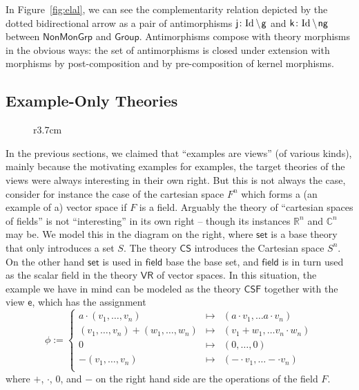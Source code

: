 \documentclass[11pt]{bluenote}
\def\setdiff#1#2{#1\kern.2em\backslash\kern.1em #2}
\def\cn#1{\mathsf{#1}}
\def\id{\text{Id}}
\begin{document}
In Figure~\ref{fig:elal}, we can see the complementarity relation depicted by the dotted
bidirectional arrow as a pair of antimorphisms $\cn{j}\colon\setdiff\id{\cn{g}}$ and
$\cn{k}\colon\setdiff\id{\cn{ng}}$ between $\cn{NonMonGrp}$ and $\cn{Group}$. Antimorphisms
compose with theory morphisms in the obvious ways: the set of antimorphisms is closed
under extension with morphisms by post-composition and by pre-composition of kernel
morphisms.

\subsection{Example-Only Theories}
\begin{wrapfigure}r{3.7cm}\vspace*{-1em}
  \vspace*{-1em}
\end{wrapfigure}
In the previous sections, we claimed that ``examples are views'' (of various kinds),
mainly because the motivating examples for examples, the target theories of the views were
always interesting in their own right. But this is not always the case, consider for
instance the case of the cartesian space $F^n$ which forms a (an example of a) vector
space if $F$ is a field. Arguably the theory of ``cartesian spaces of fields'' is not
``interesting'' in its own right -- though its instances $\mathbb{R}^n$ and $\mathbb{C}^n$
may be. We model this in the diagram on the right, where $\cn{set}$ is a base theory that
only introduces a set $S$. The theory $\cn{CS}$ introduces the Cartesian space $S^n$. On
the other hand $\cn{set}$ is used in $\cn{field}$ base the base set, and $\cn{field}$ is
in turn used as the scalar field in the theory $\cn{VR}$ of vector spaces. In this
situation, the example we have in mind can be modeled as the theory $\cn{CSF}$ together
with the view $\cn{e}$, which has the assignment
\[
\phi:=\left\{\begin{array}{rcl}
a\cdot(v_1,\ldots,v_n) & \mapsto & (a\cdot v_1,\ldots a\cdot v_n)\\
(v_1,\ldots,v_n)+(w_1,\ldots,w_n) & \mapsto & (v_1+w_1,\ldots v_n\cdot w_n)\\
0 & \mapsto & (0,\ldots,0) \\
-(v_1,\ldots,v_n) & \mapsto & (-\cdot v_1,\ldots -\cdot v_n)\\
             \end{array}\right.
\]
where $+$, $\cdot$, $0$, and $-$ on the right hand side are the operations of the field
$F$.
\end{document}
